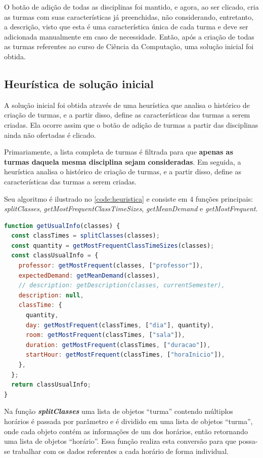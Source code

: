 O botão de adição de todas as disciplinas foi mantido, e agora, ao ser clicado, cria as turmas com suas características já preenchidas, não considerando, entretanto, a descrição, visto que esta é uma característica única de cada turma e deve ser adicionada manualmente em caso de necessidade. Então, após a criação de todas as turmas referentes ao curso de Ciência da Computação, uma solução inicial foi obtida.

\subsection{Heurística de solução inicial} \label{ssec:Heurística}

A solução inicial foi obtida através de uma heurística que analisa o histórico de criação de turmas, e a partir disso, define as características das turmas a serem criadas. Ela ocorre assim que o botão de adição de turmas a partir das disciplinas ainda não ofertadas é clicado.

Primariamente, a lista completa de turmas é filtrada para que \textbf{apenas as turmas daquela mesma disciplina sejam consideradas}. Em seguida, a heurística analisa o histórico de criação de turmas, e a partir disso, define as características das turmas a serem criadas.

Seu algoritmo é ilustrado no \autoref{code:heuristica} e consiste em 4 funções principais: \textit{splitClasses}, \textit{getMostFrequentClassTimeSizes}, \textit{getMeanDemand} e \textit{getMostFrequent}.

\begin{lstlisting}[language=JavaScript, caption={Heurística de solução inicial}, label={code:heuristica}]
function getUsualInfo(classes) {
  const classTimes = splitClasses(classes);
  const quantity = getMostFrequentClassTimeSizes(classes);
  const classUsualInfo = {
    professor: getMostFrequent(classes, ["professor"]),
    expectedDemand: getMeanDemand(classes),
    // description: getDescription(classes, currentSemester),
    description: null,
    classTime: {
      quantity,
      day: getMostFrequent(classTimes, ["dia"], quantity),
      room: getMostFrequent(classTimes, ["sala"]),
      duration: getMostFrequent(classTimes, ["duracao"]),
      startHour: getMostFrequent(classTimes, ["horaInicio"]),
    },
  };
  return classUsualInfo;
}
\end{lstlisting}

Na função \textbf{\textit{splitClasses}} uma lista de objetos ``turma'' contendo múltiplos horários é passada por parâmetro e é dividido em uma lista de objetos ``turma'', onde cada objeto contém as informações de um dos horários, então retornando uma lista de objetos ``horário''. Essa função realiza esta conversão para que possa-se trabalhar com os dados referentes a cada horário de forma individual.

